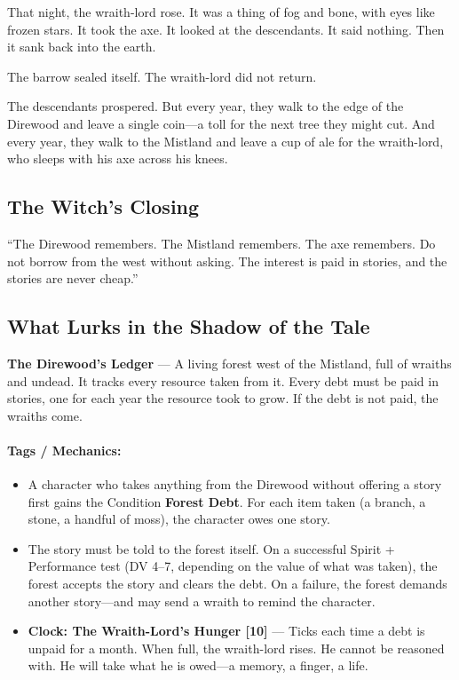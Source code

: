 \documentclass[9pt,a5paper]{extbook}
\begin{document}
That night, the wraith-lord rose. It was a thing of fog and bone, with eyes like frozen stars. It took the axe. It looked at the descendants. It said nothing. Then it sank back into the earth.

The barrow sealed itself. The wraith-lord did not return.

The descendants prospered. But every year, they walk to the edge of the Direwood and leave a single coin---a toll for the next tree they might cut. And every year, they walk to the Mistland and leave a cup of ale for the wraith-lord, who sleeps with his axe across his knees.

\subsection*{The Witch's Closing}

``The Direwood remembers. The Mistland remembers. The axe remembers. Do not borrow from the west without asking. The interest is paid in stories, and the stories are never cheap.''

\subsection*{What Lurks in the Shadow of the Tale}

\textbf{The Direwood's Ledger} --- A living forest west of the Mistland, full of wraiths and undead. It tracks every resource taken from it. Every debt must be paid in stories, one for each year the resource took to grow. If the debt is not paid, the wraiths come.

\paragraph{Tags / Mechanics:}
\begin{itemize}
    \item A character who takes anything from the Direwood without offering a story first gains the Condition \textbf{Forest Debt}. For each item taken (a branch, a stone, a handful of moss), the character owes one story.
    \item The story must be told to the forest itself. On a successful Spirit + Performance test (DV 4--7, depending on the value of what was taken), the forest accepts the story and clears the debt. On a failure, the forest demands another story---and may send a wraith to remind the character.
    \item \textbf{Clock: The Wraith-Lord's Hunger [10]} --- Ticks each time a debt is unpaid for a month. When full, the wraith-lord rises. He cannot be reasoned with. He will take what he is owed---a memory, a finger, a life.
\end{itemize}
\end{document}
